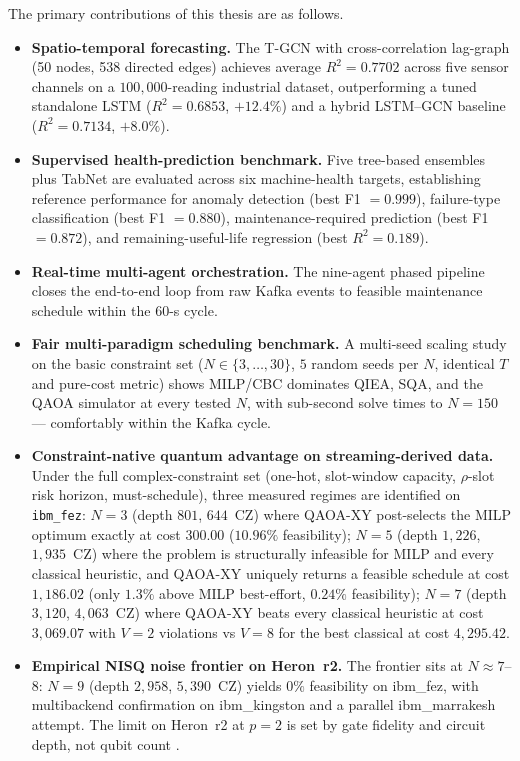 The primary contributions of this thesis are as follows.
\begin{itemize}
    \item \textbf{Spatio-temporal forecasting.} The T-GCN with cross-correlation lag-graph (50 nodes, 538 directed edges) achieves average $R^2 = 0.7702$ across five sensor channels on a $100{,}000$-reading industrial dataset, outperforming a tuned standalone LSTM ($R^2 = 0.6853$, $+12.4\%$) and a hybrid LSTM--GCN baseline ($R^2 = 0.7134$, $+8.0\%$).
    \item \textbf{Supervised health-prediction benchmark.} Five tree-based ensembles plus TabNet are evaluated across six machine-health targets, establishing reference performance for anomaly detection (best F1 $= 0.999$), failure-type classification (best F1 $= 0.880$), maintenance-required prediction (best F1 $= 0.872$), and remaining-useful-life regression (best $R^2 = 0.189$).
    \item \textbf{Real-time multi-agent orchestration.} The nine-agent phased pipeline closes the end-to-end loop from raw Kafka events to feasible maintenance schedule within the 60-s cycle. 
    \item \textbf{Fair multi-paradigm scheduling benchmark.} A multi-seed scaling study on the basic constraint set ($N \in \{3,\ldots,30\}$, $5$ random seeds per $N$, identical $T$ and pure-cost metric) shows MILP/CBC dominates QIEA, SQA, and the QAOA simulator at every tested $N$, with sub-second solve times to $N=150$ — comfortably within the Kafka cycle.
    \item \textbf{Constraint-native quantum advantage on streaming-derived data.} Under the full complex-constraint set (one-hot, slot-window capacity, $\rho$-slot risk horizon, must-schedule), three measured regimes are identified on \texttt{ibm\_fez}: $N=3$ (depth $801$, $644$~CZ) where QAOA-XY post-selects the MILP optimum exactly at cost $300.00$ ($10.96\%$ feasibility); $N=5$ (depth $1{,}226$, $1{,}935$~CZ) where the problem is structurally infeasible for MILP and every classical heuristic, and QAOA-XY uniquely returns a feasible schedule at cost $1{,}186.02$ (only $1.3\%$ above MILP best-effort, $0.24\%$ feasibility); $N=7$ (depth $3{,}120$, $4{,}063$~CZ) where QAOA-XY beats every classical heuristic at cost $3{,}069.07$ with $V=2$ violations vs $V=8$ for the best classical at cost $4{,}295.42$.
    \item \textbf{Empirical NISQ noise frontier on Heron~r2.} The frontier sits at $N \approx 7$--$8$: $N=9$ (depth $2{,}958$, $5{,}390$~CZ) yields $0\%$ feasibility on ibm\_fez, with multibackend confirmation on ibm\_kingston and a parallel ibm\_marrakesh attempt. The limit on Heron~r2 at $p=2$ is set by gate fidelity and circuit depth, not qubit count \cite{Blekos2024,Preskill2018}.
\end{itemize}

